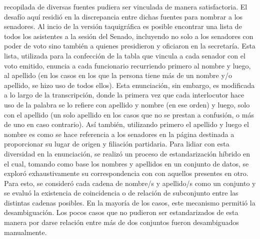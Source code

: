 recopilada de diversas fuentes pudiera ser vinculada de manera
satisfactoria. El desaf\'io aqu\'i residi\'o en la discrepancia entre
dichas fuentes para nombrar a los senadores. Al incio de la versi\'on taquigr\'afica
es posible encontrar una lista de todos los asistentes a la sesi\'on del Senado,
incluyendo no solo a los senadores con poder de voto sino tambi\'en a quienes presidieron
y oficiaron en la secretar\'ia. Esta lista, utilizada para la confecci\'on
de la tabla que vincula a cada senador con el voto emitido, enuncia a cada funcionario
recurriendo primero al nombre y luego, al apellido (en los casos en los que
la persona tiene m\'as de un nombre y/o apellido, se hizo uso de todos ellos). Esta
enunciaci\'on, sin embargo, es modificada a lo largo de la transcripci\'on, donde la
primera vez que cada interlocutor hace uso de la palabra se lo refiere con apellido
y nombre (en ese orden) y luego, solo con el apellido (un solo apellido en los casos que no
se prestan a confusi\'on, o m\'as de uno en caso contrario). As\'i tambi\'en, utilizando primero
el apellido y luego el nombre es como se hace referencia a los senadores en la p\'agina
destinada a proporcionar su lugar de origen y filiaci\'on partidaria. Para lidiar con esta
diversidad en la enunciaci\'on, se realiz\'o un proceso de estandarizaci\'on h\'ibrido en el
cual, tomando como base los nombres y apellidos en un conjunto de datos, se explor\'o
exhaustivamente su correspondencia con con aquellos presentes en otro.
Para esto, se consider\'o cada cadena de nombre/s y apellido/s como un conjunto
y se evalu\'o la existencia de coincidencia
o de relaci\'on de subconjunto entre las distintas cadenas posibles. En la mayor\'ia de los casos,
este mecanismo permiti\'o la desambiguaci\'on. Los pocos casos que no pudieron ser estandarizados
de esta manera por darse relaci\'on entre m\'as de dos conjuntos fueron desambiguados manualmente.